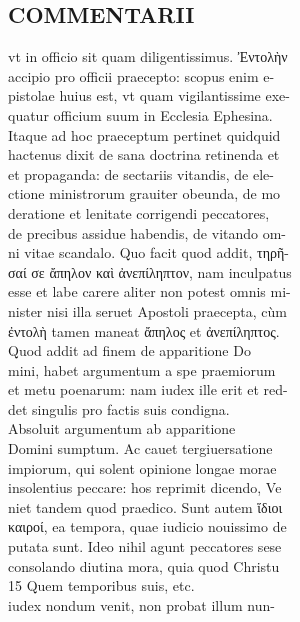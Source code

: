\documentclass{article}
\begin{document}
\begin{pages}
\section*{COMMENTARII \\
                }vt in officio sit quam diligentissimus. Ἐντολὴν \\
                accipio pro officii praecepto: scopus enim e- \\
                pistolae huius est, vt quam vigilantissime exe- \\
                quatur officium suum in Ecclesia Ephesina. \\
                Itaque ad hoc praeceptum pertinet quidquid \\
                hactenus dixit de sana doctrina retinenda et \\
                et propaganda: de sectariis vitandis, de ele- \\
                ctione ministrorum grauiter obeunda, de mo \\
                deratione et lenitate corrigendi peccatores, \\
                de precibus assidue habendis, de vitando om- \\
                ni vitae scandalo. Quo facit quod addit, τηρῆ- \\
                σαί σε ἄπηλον καὶ ἀνεπίληπτον, nam inculpatus \\
                esse et labe carere aliter non potest omnis mi- \\
                nister nisi illa seruet Apostoli praecepta, cùm \\
                ἐντολὴ tamen maneat ἄπηλος et ἀνεπίληπτος. \\
                Quod addit ad finem de apparitione Do \\
                mini, habet argumentum a spe praemiorum \\
                et metu poenarum: nam iudex ille erit et red- \\
                det singulis pro factis suis condigna. \\
                Absoluit argumentum ab apparitione \\
                Domini sumptum. Ac cauet tergiuersatione \\
                impiorum, qui solent opinione longae morae \\
                insolentius peccare: hos reprimit dicendo, Ve \\
                niet tandem quod praedico. Sunt autem ἵδιοι \\
                καιροί, ea tempora, quae iudicio nouissimo de \\
                putata sunt. Ideo nihil agunt peccatores sese \\
                consolando diutina mora, quia quod Christu \\
                15 Quem temporibus suis, etc. \\
                iudex nondum venit, non probat illum nun- \\
                

\end{pages}
\end{document}
